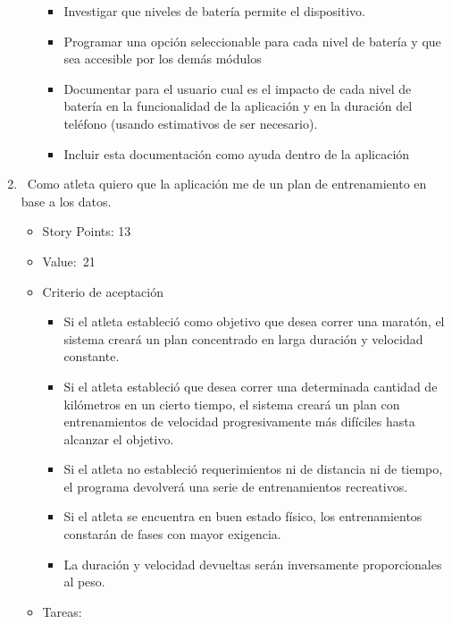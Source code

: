 \begin{enumerate}
\begin{itemize}
    \begin{itemize}
    \itemsep1pt\parskip0pt
    \item
      Investigar que niveles de batería permite el dispositivo.
    \item
      Programar una opción seleccionable para cada nivel de batería y
      que sea accesible por los demás módulos
    \item
      Documentar para el usuario cual es el impacto de cada nivel de
      batería en la funcionalidad de la aplicación y en la duración del
      teléfono (usando estimativos de ser necesario).
    \item
      Incluir esta documentación como ayuda dentro de la aplicación
    \end{itemize}
  \end{itemize}
\item
  ~Como atleta quiero que la aplicación me de un plan de entrenamiento
  en base a los datos.

  \begin{itemize}
  \item
    Story Points: 13
  \item
    Value:~21
  \item
    Criterio de aceptación

    \begin{itemize}
    \item
      Si el atleta estableció como objetivo que desea correr una
      maratón, el sistema creará un plan concentrado en larga duración y
      velocidad constante.
    \item
      Si el atleta estableció que desea correr una determinada cantidad
      de kilómetros en un cierto tiempo, el sistema creará un plan con
      entrenamientos de velocidad progresivamente más difíciles hasta
      alcanzar el objetivo.
    \item
      Si el atleta no estableció requerimientos ni de distancia ni de
      tiempo, el programa devolverá una serie de entrenamientos
      recreativos.
    \item
      Si el atleta se encuentra en buen estado físico, los
      entrenamientos constarán de fases con mayor exigencia.
    \item
      La duración y velocidad devueltas serán inversamente
      proporcionales al peso.
    \end{itemize}
  \item
    Tareas:


\end{itemize}
\end{enumerate}
